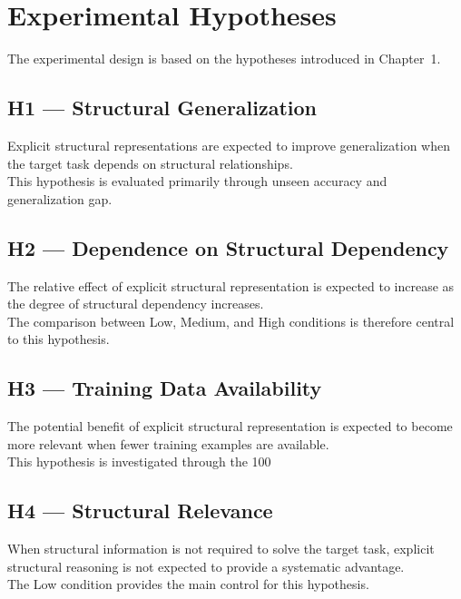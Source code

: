 \section{Experimental Hypotheses}

\noindent
The experimental design is based on the hypotheses introduced in Chapter~1.

\subsection{H1 --- Structural Generalization}

\noindent
Explicit structural representations are expected to improve generalization when the target task depends on structural relationships.
\\
This hypothesis is evaluated primarily through unseen accuracy and generalization gap.

\subsection{H2 --- Dependence on Structural Dependency}

\noindent
The relative effect of explicit structural representation is expected to increase as the degree of structural dependency increases.
\\
The comparison between Low, Medium, and High conditions is therefore central to this hypothesis.

\subsection{H3 --- Training Data Availability}

\noindent
The potential benefit of explicit structural representation is expected to become more relevant when fewer training examples are available.
\\
This hypothesis is investigated through the 100%

\subsection{H4 --- Structural Relevance}

\noindent
When structural information is not required to solve the target task, explicit structural reasoning is not expected to provide a systematic advantage.
\\
The Low condition provides the main control for this hypothesis.

